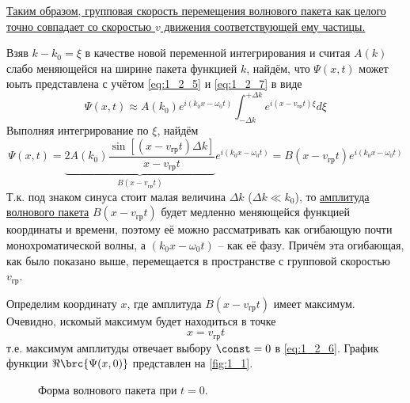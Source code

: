 \underline{Таким образом, групповая скорость перемещения волнового пакета как целого точно совпадает со скоростью $v$ движения соответствующей ему частицы.}

Взяв $k - k_0 = \xi$ в качестве новой переменной интегрирования и считая $A(k)$ слабо меняющейся на ширине пакета функцией $k$, найдём, что $\Psi(x,t)$ может юыть представлена с учётом \eqref{eq:1_2_5} и \eqref{eq:1_2_7} в виде%
%
$$
\Psi(x,t) \approx A(k_0) e^{i(k_0 x - \omega_0 t) }\int^{+ \Delta k}_{ - \Delta k} e^{i(x - v_{\text{гр}}t)\xi} d\xi
$$%
%
Выполняя интегрирование по $\xi$, найдём
\begin{equation}
\label{eq:1_2_8}
\Psi(x,t) =
  \underbrace{
    2 A(k_0) \frac{\sin [(x - v_{\text{гр}}t)\Delta k]}{x - v_{\text{гр}}t}
  }_{B(x - v_{\text{гр}}t)}
  e^{i(k_0 x - \omega_0 t)} = B(x - v_{\text{гр}}t) e^{i(k_0 x - \omega_0 t)}
\end{equation}%
%
Т.к. под знаком синуса стоит малая величина $\Delta k$ ($\Delta k \ll k_0$), то \underline{амплитуда волнового пакета} $B(x - v_{\text{гр}}t)$ будет медленно меняющейся функцией координаты и времени, поэтому её можно рассматривать как огибающую почти монохроматической волны, а $(k_0 x - \omega_0 t)$ -- как её фазу. Причём эта огибающая, как было показано выше, перемещается в пространстве с групповой скоростью $v_{\text{гр}}$.

Определим координату $x$, где амплитуда $B(x - v_{\text{гр}}t)$ имеет максимум. Очевидно, искомый максимум будет находиться в точке
$$x = v_{\text{гр}}t$$
т.е. максимум амплитуды отвечает выбору $\const = 0$ в \eqref{eq:1_2_6}. График функции $\Re\brc{\Psi(x, 0)}$ представлен на \autoref{fig:1_1}.

\begin{figure}[h]
\centering
{}
\caption{Форма волнового пакета при $t=0$.} \label{fig:1_1}
\end{figure}


